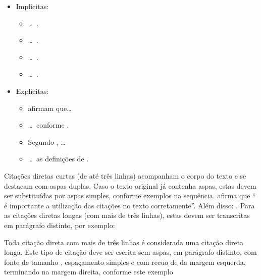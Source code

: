 \documentclass[%
  a4paper,%
  12pt,%
  fleqn,%
  english,%
  brazilian,%
]{article}
\begin{document}
\begin{itemize}
\item Implícitas:
\begin{itemize}
\item \ldots\ \cite{Alencar2007}.
\item \ldots\ \cite{Kalakota2002,Ramos2003}.
\item \ldots\ \cite{Carvalho2004,Andujar2006,Purcidonio2008}.
\item \ldots\ \cite{Alencar2007,Carvalho2004}.
\end{itemize}
\item Explícitas:
\begin{itemize}
\item \textcite{Alencar2007} afirmam que\ldots%
\item \ldots\ conforme \textcite{Kalakota2002,Ramos2003}.
\item Segundo \textcite{Carvalho2004,Andujar2006,Purcidonio2008}, \ldots%
\item \ldots\ as definições de \textcite{Alencar2007,Carvalho2004}.
\end{itemize}
\end{itemize}

Citações diretas curtas (de até três linhas) acompanham o corpo do texto e se destacam com aspas duplas.
Caso o texto original já contenha aspas, estas devem ser substituídas por aspas simples, conforme exemplos na sequência.
\textcite[10]{Fulano2021} afirma que \enquote{\textelp{} é importante a utilização das citações no texto corretamente}.
Além disso: .
Para as citações diretas longas (com mais de três linhas), estas devem ser transcritas em parágrafo distinto, por exemplo:

\begin{DisplayCitation}[brazilian]{\cite[150]{Fulano2021}}
Toda citação direta com mais de três linhas é considerada uma citação direta longa.
Este tipo de citação deve ser escrita sem aspas, em parágrafo distinto, com fonte de tamanho , espaçamento simples e com recuo de  da margem esquerda, terminando na margem direita, conforme este exemplo
\end{DisplayCitation}
\end{document}
